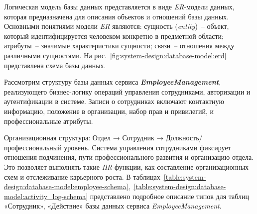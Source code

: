 Логическая модель базы данных представляется в виде \textit{ER}-модели данных, которая предназначена для описания объектов и отношений базы данных. Основными понятиями модели \textit{ER} являются: сущность (\textit{entity})~-- объект, который идентифицируется человеком конкретно в предметной области; атрибуты~-- значимые характеристики сущности; связи~-- отношения между различными сущностями. На рис.~\ref{fig:system-design:database-model:erd} представлена схема базы данных.


Рассмотрим структуру базы данных сервиса \textbf{\textit{EmployeeManagement}}, реализующего бизнес-логику операций управления сотрудниками, авторизации и аутентификации в системе. Записи о сотрудниках включают контактную информацию, положение в организации, набор прав и привилегий, и профессиональные атрибуты.

Организационная структура: Отдел → Сотрудник → Должность/профессиональный уровень. Система управления сотрудниками фиксирует отношения подчинения, пути профессионального развития и организацию отдела. Это позволяет выполнять такие \textit{HR}-функции, как составление организационных схем и отслеживание карьерного роста. В таблицах~\ref{table:system-design:database-model:employee-schema},~\ref{table:system-design:database-model:activity_log-schema} представлено подробное описание типов для таблиц «Сотрудник», «Действие» базы данных сервиса \textit{EmployeeManagement}.

